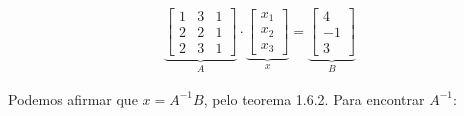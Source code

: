 \documentclass[a4paper,12pt]{article}
\begin{document}
\begin{align*}
    \underbrace{
    \begin{bmatrix}
        1 & 3 & 1\\
        2  & 2 & 1\\
        2 & 3 & 1
    \end{bmatrix}}_{A} \cdot
    \underbrace{
    \begin{bmatrix}
        x_1\\
        x_2\\
        x_3
    \end{bmatrix}}_{x}
    =
    \underbrace{
    \begin{bmatrix}
        4\\
        -1\\
        3
    \end{bmatrix}}_{B}
\end{align*}

Podemos afirmar que $x = A^{-1}B$, pelo teorema 1.6.2. Para encontrar $A^{-1}$:
\end{document}
